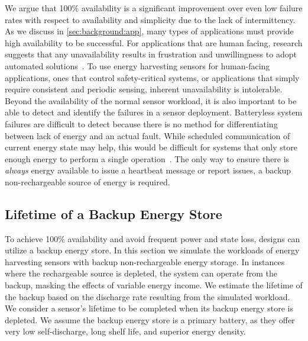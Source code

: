 We argue that 100\% availability is a significant improvement over
even low failure rates with respect to availability
and simplicity due to the lack of intermittency.
As we discuss in \cref{sec:background:app}, many types of applications 
must provide high availability to be successful.
For applications that are human facing, research suggests that any unavailability
results in frustration and %
unwillingness to adopt automated solutions~\cite{brushHome11, edwardsHome01, shehanHome07}.
To use energy harvesting sensors for human-facing applications, ones that control safety-critical systems, or applications that simply require consistent and periodic sensing, inherent unavailability is intolerable.
Beyond the availability of the normal sensor workload, it is also important to be able to detect and identify the failures in a sensor deployment.
Batteryless system failures are difficult to detect %
because there is no method for differentiating between lack of energy
and an actual fault. While scheduled communication of current energy state
may help, this would be difficult for systems that only store enough
energy to perform a single operation~\cite{hesterFlicker17, yervaGrafting12, colinReconfigurable18,campbell2018energy}.
The only way to ensure there is \textit{always} energy available to issue a heartbeat message or report issues, a backup non-rechargeable source of energy is required.


\subsection{Lifetime of a Backup Energy Store}
\label{sec:primary:lifetime}

To achieve 100\% availability and avoid frequent power and state loss,
designs can utilize a backup energy store.
In this section we simulate the workloads of energy harvesting sensors with backup non-rechargeable energy storage.
In instances where the rechargeable source is depleted, the system
can operate from the backup, masking the effects of variable energy income.
We estimate the lifetime of the backup based on the discharge rate resulting from the simulated workload. 
We consider a sensor's lifetime to be completed when its backup energy store is depleted.
We assume the backup energy store is  
a primary battery, as they offer very low self-discharge, long shelf life, and
superior energy density.

